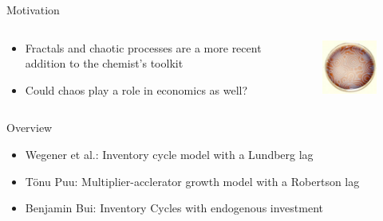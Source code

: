 \documentclass{beamer}
\begin{document}
\begin{frame}{Motivation}
	\begin{columns}
	\begin{column}{0.5\textwidth}
		\begin{itemize}
			\item Fractals and chaotic processes are a more recent addition to the chemist's toolkit\autocite{Beutel2007,Morris2010}
			\item Could chaos play a role in economics as well?
		\end{itemize}
	\end{column}
	\begin{column}{0.5\textwidth}
		\begin{figure}
			\centering
			\includegraphics{bz_reaction.jpg}
		\end{figure}
	\end{column}
	\end{columns}
\end{frame}
\begin{frame}{Overview}
	\begin{itemize}
		\item Wegener et al.: Inventory cycle model with a Lundberg lag
		\item T\"onu Puu: Multiplier-acclerator growth model with a Robertson lag
		\item Benjamin Bui: Inventory Cycles with endogenous investment
	\end{itemize}
\end{frame}
\end{document}
